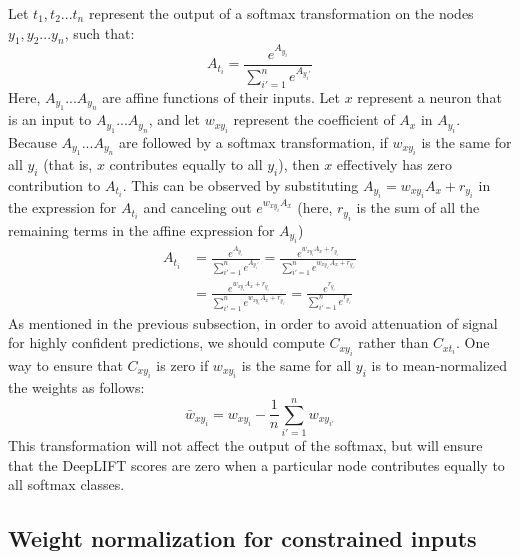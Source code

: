 \documentclass{article}
\begin{document}
Let ${t_1, t_2...t_n}$ represent the output of a softmax transformation on the nodes ${y_1, y_2...y_n}$, such that:
\begin{equation}
A_{t_i} = \frac{e^{A_{y_i}}}{\sum_{i' = 1}^n e^{A_{y_i'}}} 
\end{equation}
Here, $A_{y_1}...A_{y_n}$ are affine functions of their inputs. Let $x$ represent a neuron that is an input to $A_{y_1}...A_{y_n}$, and let $w_{xy_i}$ represent the coefficient of $A_x$ in $A_{y_i}$. Because $A_{y_1}...A_{y_n}$ are followed by a softmax transformation, if $w_{xy_i}$ is the same for all $y_i$ (that is, $x$ contributes equally to all $y_i$), then $x$ effectively has zero contribution to $A_{t_i}$. This can be observed by substituting $A_{y_i} = w_{xy_i}A_x + r_{y_i}$ in the expression for $A_{t_i}$ and canceling out $e^{w_{xy_i}A_x}$ (here, $r_{y_i}$ is the sum of all the remaining terms in the affine expression for $A_{y_i}$)
\begin{equation}
\begin{aligned}
A_{t_i} &= \frac{e^{A_{y_i}}}{\sum_{i' = 1}^n e^{A_{y_i'}}} = \frac{e^{w_{xy_i}A_x + r_{y_i}}}{\sum_{i' = 1}^n e^{w_{xy_{i'}}A_x + r_{y_{i'}}}}\\
           &= \frac{e^{w_{xy_i}A_x + r_{y_i}}}{\sum_{i' = 1}^n e^{w_{xy_i}A_x + r_{y_{i'}}}} = \frac{e^{r_{y_i}}}{\sum_{i' = 1}^n e^{r_{y_{i'}}}} 
\end{aligned}
\end{equation}
As mentioned in the previous subsection, in order to avoid attenuation of signal for highly confident predictions, we should compute $C_{xy_i}$ rather than $C_{xt_i}$. One way to ensure that $C_{xy_i}$ is zero if $w_{xy_i}$ is the same for all $y_i$ is to mean-normalized the weights as follows:
\begin{equation}
\bar{w}_{xy_i} = w_{xy_i} - \frac{1}{n} \sum_{i' = 1}^n w_{xy_{i'}}  
\end{equation} 
This transformation will not affect the output of the softmax, but will ensure that the DeepLIFT scores are zero when a particular node contributes equally to all softmax classes.

\subsection{Weight normalization for constrained inputs}
\end{document}
